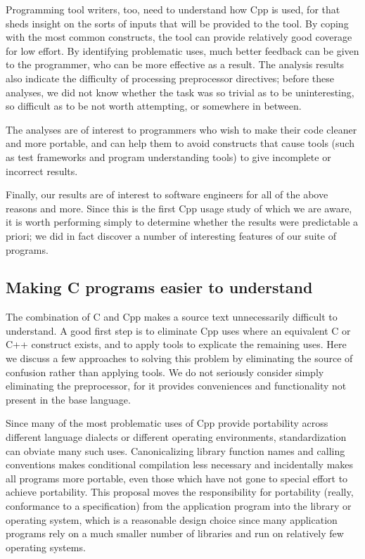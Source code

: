 \documentclass[11pt]{article}
\begin{document}
Programming tool writers, too, need to understand how Cpp is used, for that
sheds insight on the sorts of inputs that will be provided to the tool.  By
coping with the most common constructs, the tool can provide relatively
good coverage for low effort.  By identifying problematic uses, much better
feedback can be given to the programmer, who can be more effective as a
result.  The analysis results also indicate the difficulty of processing
preprocessor directives; before these analyses, we did not know whether the
task was so trivial as to be uninteresting, so difficult as to be not worth
attempting, or somewhere in between.

The analyses are of interest to programmers who wish to make their code
cleaner and more portable, and can help them to avoid constructs that cause
tools (such as test frameworks and program understanding tools)
to give incomplete or incorrect results.


Finally, our results are of interest to software engineers for all of the
above reasons and more.  Since this is the first Cpp usage study of which
we are aware, it is worth performing simply to determine whether the
results were predictable a priori; we did in fact discover a number of
interesting features of our suite of programs.


\subsection{Making C programs easier to understand}

The combination of C and Cpp makes a source text unnecessarily difficult to
understand.  A good first step is to eliminate Cpp uses where an equivalent
C or C++ construct exists, and to apply tools to explicate the remaining
uses.  Here we discuss a few approaches to solving this problem by
eliminating the source of confusion rather than applying tools.  We do not
seriously consider simply eliminating the preprocessor, for it provides
conveniences and functionality not present in the base language.

Since many of the most problematic uses of Cpp provide portability across
different language dialects or different operating environments,
standardization can obviate many such uses.  Canonicalizing library
function names and calling conventions makes conditional compilation less
necessary and incidentally makes all programs more portable, even those
which have not gone to special effort to achieve portability.  This
proposal moves the responsibility for portability (really, conformance to a
specification) from the application program into the library or operating
system, which is a reasonable design choice since many application programs
rely on a much smaller number of libraries and run on relatively few
operating systems.
\end{document}
